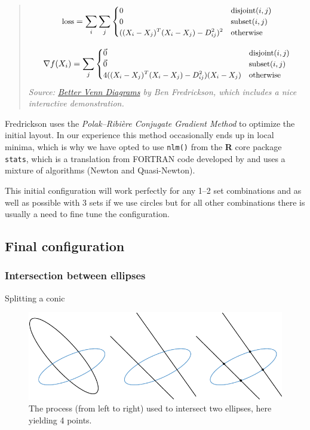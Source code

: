 \documentclass[
  headsepline=true,headings=standardclasses%
]{scrartcl}
\theoremstyle{definition}
\theoremstyle{definition}
\theoremstyle{definition}
\theoremstyle{remark}
\begin{document}
\begin{quote}
\[\small
\text{loss} = \sum_i \sum_j { {\begin{cases}
    0 & \text{disjoint}(i, j)\\ 
    0 & \text{subset}(i, j)\\ 
    ((X_{i} - X_{j})^T(X_{i} - X_{j}) - D_{ij}^2) ^2  & \text{otherwise} \\ 
\end{cases}}}
\]

\[\small
\nabla f(X_{i}) = \sum_j {\begin{cases}
     \vec{0} & \text{disjoint}(i, j)\\ 
     \vec{0} & \text{subset}(i, j)\\ 
     4 {((X_{i} - X_{j})^T(X_{i} - X_{j}) - D_{ij}^2)} (X_{i} -
     X_{j}) & \text{otherwise} \\ 
\end{cases}}\] \emph{Source:
\href{http://www.benfrederickson.com/better-venn-diagrams/}{Better Venn
Diagrams} by Ben Fredrickson, which includes a nice interactive
demonstration.}
\end{quote}

Fredrickson uses the \emph{Polak--Ribière Conjugate Gradient Method} to
optimize the initial layout. In our experience this method occasionally
ends up in local minima, which is why we have opted to use
\texttt{nlm()} from the \textbf{R} core package \texttt{stats}, which is
a translation from FORTRAN code developed by \textcite{schnabel_1985}
and uses a mixture of algorithms (Newton and Quasi-Newton).

This initial configuration will work perfectly for any 1--2 set
combinations and as well as possible with 3 sets if we use circles but
for all other combinations there is usually a need to fine tune the
configuration.

\subsection{Final configuration}\label{final-configuration}

\subsubsection{Intersection between
ellipses}\label{intersection-between-ellipses}

Splitting a conic

\begin{figure}
\centering
\includegraphics{thesis_files/figure-latex/unnamed-chunk-2-1.pdf}
\caption{\label{fig:unnamed-chunk-2}The process (from left to right) used to
intersect two ellipses, here yielding 4 points.}
\end{figure}
\end{document}
